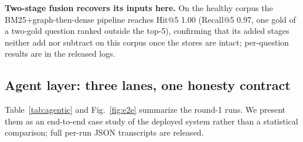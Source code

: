 \documentclass[preprint,12pt]{elsarticle}
\begin{document}
\textbf{Two-stage fusion recovers its inputs here.} On the healthy corpus
the BM25+graph-then-dense pipeline reaches Hit@5 1.00 (Recall@5 0.97, one gold of a two-gold question ranked
outside the top-5), confirming that its added stages
 neither add nor subtract on this corpus once the stores are intact;
per-question results are in the released logs.

\subsection{Agent layer: three lanes, one honesty contract}
\label{sec:agentic}

\begin{table}[!htbp]
\centering
\small
\caption{Agentic end-to-end runs, round 1: four questions $\times$ four
arms through the public chat API (engine \texttt{omp} over GLM-5.3-Flash,
20-turn budget; the full grid is run twice, see text). ``Cite'' = the
answer names the gold document;
``Facts'' = ground-truth fact markers contained / available. The bare
arm's sporadic marker matches are coincidental: it cites no source, and
its answers typically disclaim figures as unverified parametric recall.}
\label{tab:agentic}

\end{table}

Table~\ref{tab:agentic} and Fig.~\ref{fig:e2e} summarize the round-1 runs.
We present them as an end-to-end case study of the deployed system rather
than a statistical comparison; full per-run JSON transcripts are released.
\end{document}
